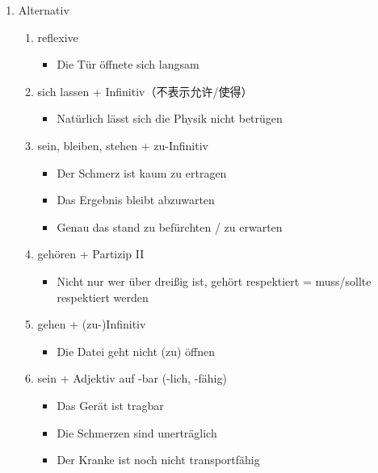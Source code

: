 \documentclass[UTF8]{report}
\begin{document}
\begin{enumerate}
    \item Alternativ
    \begin{enumerate}
        \item reflexive
        \begin{itemize}
            \item Die Tür öffnete sich langsam
        \end{itemize}
        \item sich lassen + Infinitiv（不表示允许/使得）
        \begin{itemize}
            \item Natürlich lässt sich die Physik nicht betrügen
        \end{itemize}
        \item sein, bleiben, stehen + zu-Infinitiv
        \begin{itemize}
            \item Der Schmerz ist kaum zu ertragen
            \item Das Ergebnis bleibt abzuwarten
            \item Genau das stand zu befürchten / zu erwarten
        \end{itemize}
        \item gehören + Partizip II
        \begin{itemize}
            \item Nicht nur wer über dreißig ist, gehört respektiert = muss/sollte respektiert werden
        \end{itemize}
        \item gehen + (zu-)Infinitiv
        \begin{itemize}
            \item Die Datei geht nicht (zu) öffnen
        \end{itemize}
        \item sein + Adjektiv auf -bar (-lich, -fähig)
        \begin{itemize}
            \item Das Gerät ist tragbar
            \item Die Schmerzen sind unerträglich
            \item Der Kranke ist noch nicht transportfähig
        \end{itemize}
    \end{enumerate}
\end{enumerate}
\end{document}
